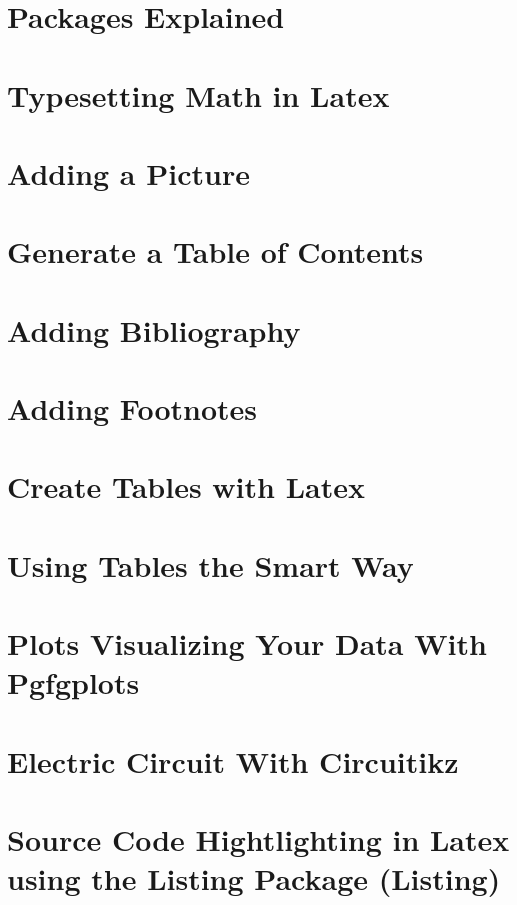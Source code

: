 \documentclass{wileySix}
\begin{document}
\chapter{Packages Explained}

\chapter{Typesetting Math in Latex}

\chapter{Adding a Picture}

\chapter{Generate a Table of Contents}

\chapter{Adding Bibliography}

\chapter{Adding Footnotes}

\chapter{Create Tables with Latex}

\chapter{Using Tables the Smart Way}

\chapter{Plots Visualizing Your Data With Pgfgplots}

\chapter{Electric Circuit With Circuitikz}

\chapter{Source Code Hightlighting in Latex using the Listing Package (Listing)}
\end{document}

